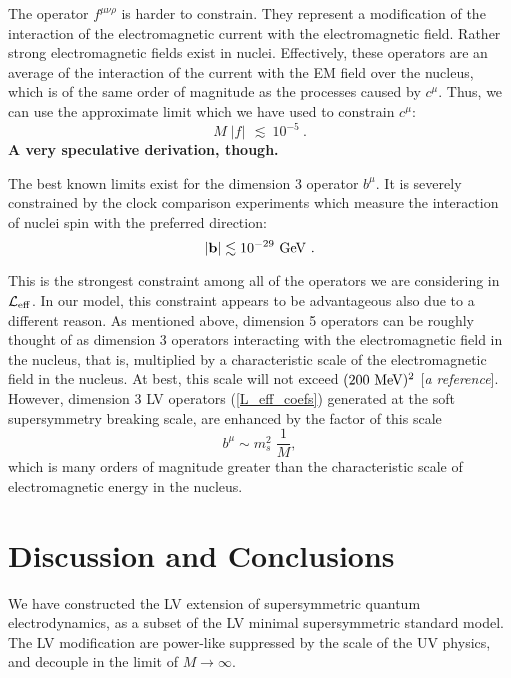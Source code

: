 \documentclass[12pt]{revtex4}
\begin{document}
The operator $ f^{\mu\nu\rho} $ 
is harder to constrain.
They represent a modification of the interaction of 
the electromagnetic current with the electromagnetic field.
Rather strong electromagnetic fields exist in nuclei.
Effectively, these operators are an average of the interaction
of the current with the EM field over the nucleus, which is
of the same order of magnitude as the processes caused 
by $ c^\mu $.
Thus, we can use the approximate limit which we have used to
constrain $ c^\mu $:
\begin{equation}
M\; | f |\, ~\lesssim~ 10^{-5}~.
\end{equation}
{\bf A very speculative derivation, though.}

The best known limits exist for the dimension 3 operator
$ b^\mu $.
It is severely constrained by the clock comparison experiments which
measure the interaction of nuclei spin with the preferred
direction:
\begin{equation}
| {\mathbf b} | \lesssim 10^{-29}~{\rm GeV}
        ~.
\end{equation}

This is the strongest constraint among all of the operators
we are considering in $ \mathcal{L}_{\rm eff} $.
In our model, this constraint appears to be advantageous
also due to a different reason.
As mentioned above, dimension 5 operators can be roughly
thought of as dimension 3 operators interacting with the
electromagnetic field in the nucleus, that is,
multiplied by a characteristic scale of the electromagnetic
field in the nucleus.
At best, this scale will not exceed $ (200\ {\rm MeV})^2 $
[{\it a reference}].
However, dimension 3 LV operators (\ref{L_eff_coefs}) 
generated at the soft
supersymmetry breaking scale, are enhanced by the factor
of this scale
\[
b^\mu \sim m_s^2\; \frac{1}{M},
\]
which is many orders of magnitude greater than the characteristic
scale of electromagnetic energy in the nucleus.






\section{Discussion and Conclusions}

We have constructed the LV extension of supersymmetric quantum electrodynamics,
as a subset of the LV minimal supersymmetric standard model.
The LV modification are power-like suppressed by the scale of the UV physics,
and decouple in the limit of $M\to \infty$. 
\end{document}
